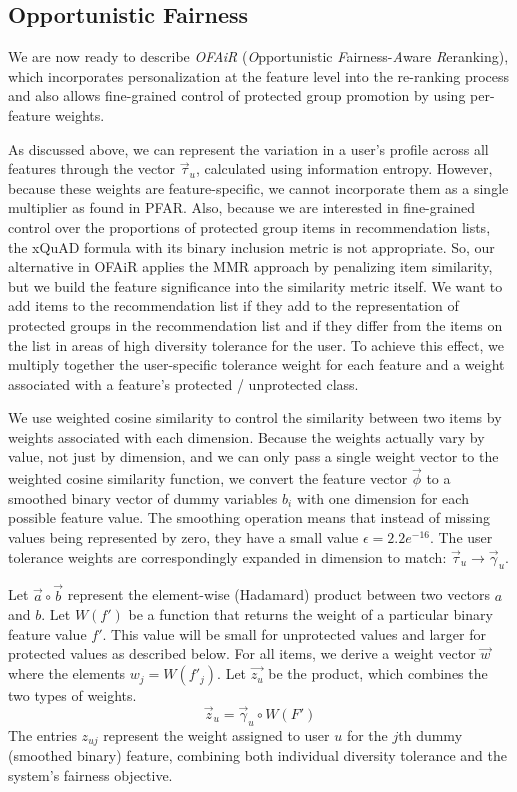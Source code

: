 \subsection{Opportunistic Fairness}
\label{subsec:ofair_opp_fair}

We are now ready to describe \textit{OFAiR} (\textit{O}pportunistic \textit{F}airness-\textit{A}ware \textit{R}eranking), which incorporates personalization at the feature level into the re-ranking process and also allows fine-grained control of protected group promotion by using per-feature weights. 

As discussed above, we can represent the variation in a user's profile across all features through the vector $\vec{\tau}_u$, calculated using information entropy. However, because these weights are feature-specific, we cannot incorporate them as a single multiplier as found in PFAR. Also, because we are interested in fine-grained control over the proportions of protected group items in recommendation lists, the xQuAD formula with its binary inclusion metric is not appropriate. So, our alternative in OFAiR applies the MMR approach by penalizing item similarity, but we build the feature significance into the similarity metric itself. We want to add items to the recommendation list if they add to the representation of protected groups in the recommendation list and if they differ from the items on the list in areas of high diversity tolerance for the user. To achieve this effect, we multiply together the user-specific tolerance weight for each feature and a weight associated with a feature's protected / unprotected class. 

We use weighted cosine similarity to control the similarity between two items by weights associated with each dimension. Because the weights actually vary by value, not just by dimension, and we can only pass a single weight vector to the weighted cosine similarity function, we convert the feature vector $\vec{\phi}$ to a smoothed binary vector of dummy variables $b_i$ with one dimension for each possible feature value. The smoothing operation means that instead of missing values being represented by zero, they have a small value $\epsilon = 2.2e^{-16}$. The user tolerance weights are correspondingly expanded in dimension to match: $\vec{\tau}_u \rightarrow \vec{\gamma}_u$. 

Let $\vec{a} \circ \vec{b}$ represent the element-wise (Hadamard) product between two vectors $a$ and $b$. Let $W(f')$ be a function that returns the weight of a particular binary feature value $f'$. This value will be small for unprotected values and larger for protected values as described below. For all items, we derive a weight vector $\vec{w}$ where the elements $w_j = W(f'_{j})$. Let $\vec{z_{u}}$ be the product, which combines the two types of weights. %
\begin{equation}
\vec{z}_u = \vec{\gamma}_u \circ W(F')
\end{equation}
The entries $z_{uj}$ represent the weight assigned to user $u$ for the $j$th dummy (smoothed binary) feature, combining both individual diversity tolerance and the system's fairness objective.

